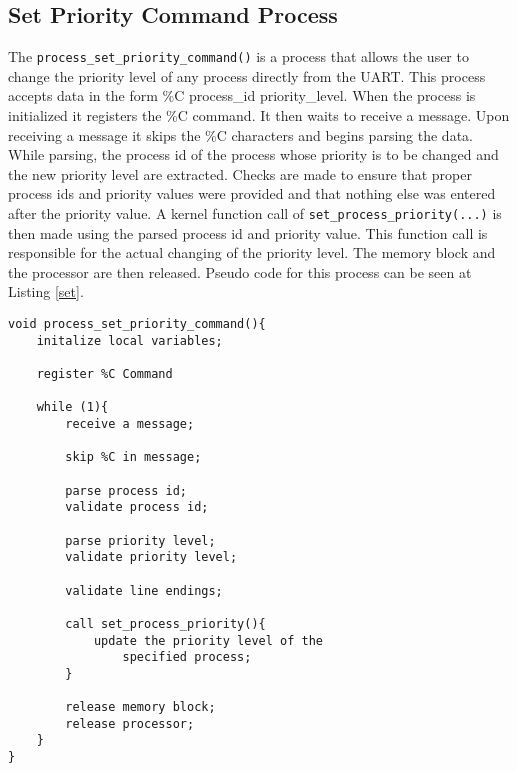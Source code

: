 \documentclass[oneside]{article}
\begin{document}
\subsection*{Set Priority Command Process} 

The \texttt{process\_set\_priority\_command()} is a process that allows the user to change the priority level 
of any process directly from the UART. This process accepts data in the form \%C process\_id 
priority\_level. When the process is initialized it registers the \%C command. It then waits to receive a message. 
Upon receiving a message it skips the \%C characters and begins parsing the data. While parsing, the process id of the process  
whose priority is to be changed and the new priority level are extracted. Checks are made to ensure that proper process ids and 
priority values were provided and that nothing else was entered after the priority value. A kernel function call of 
\texttt{set\_process\_priority(...)} is then made using the parsed process id and priority value. This function call is 
responsible for the actual changing of the priority level. The memory block and the processor are then released. 
Pseudo code for this process can be seen at Listing \ref{set}.


\begin{lstlisting}
void process_set_priority_command(){
    initalize local variables;
    
    register %C Command

    while (1){
        receive a message;

        skip %C in message;

        parse process id;
        validate process id;

        parse priority level;
        validate priority level;

        validate line endings;

        call set_process_priority(){
            update the priority level of the
                specified process;
        }

        release memory block;
        release processor;
    }
}
\end{lstlisting}
\end{document}
